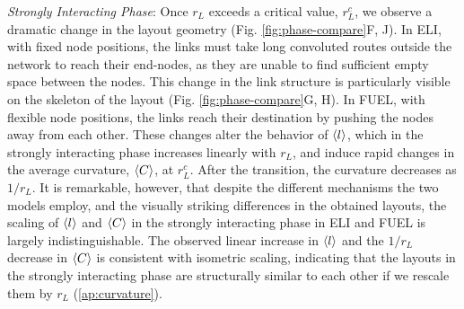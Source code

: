 \documentclass[endfloats,nofootinbib,preprint,floatfix,titlepage,superscriptaddress]{revtex4} %
\newcommand{\outNim}[1]{}
\begin{document}
{\em Strongly Interacting Phase}: Once  $r_L$ exceeds a critical value, $r_L^c$, we observe a dramatic change in the layout geometry (Fig. \ref{fig:phase-compare}F, J). 
In ELI, with fixed node positions, the links must take long convoluted routes outside the network to reach their end-nodes, as they are unable to find sufficient empty space between the nodes.  
This change in the link structure is particularly visible on the skeleton of the layout (Fig. \ref{fig:phase-compare}G, H).
In FUEL, with flexible node positions, the links reach their destination by pushing the nodes away from each other. 
These changes alter the behavior of $\left<l\right>$, which in the strongly interacting phase increases linearly with $r_L$,  
and induce rapid changes in the average curvature, $\left<C\right>$,  at $r^c_L$. %
After the transition, the curvature decreases as $1/r_L$. 
It is remarkable, however, that despite the different mechanisms the two models employ, and the visually striking differences in the obtained layouts, the scaling of $\left<l\right>$ and $\left<C\right>$ in the strongly interacting phase in ELI and FUEL is largely indistinguishable. 
The observed linear increase in $\left<l\right>$ and the $1/r_L$ decrease in $\left<C\right>$ is consistent with isometric scaling, indicating that the layouts in the strongly interacting phase are structurally similar to each other if we rescale them by $r_L$ %
(\ref{ap:curvature}). 
\outNim{ 
The existence of a phase transition at $r_c$ is also signalled by
the relaxation time, representing the characteristic time the simulations needs to find an equilibrium solution. The strong peak for FUEL near $r_L^c$ (Fig. \ref{fig:phase-compare}D)
documents a critical slowing down typically observed in systems undergoing a second order phase transition.} 
\end{document}
